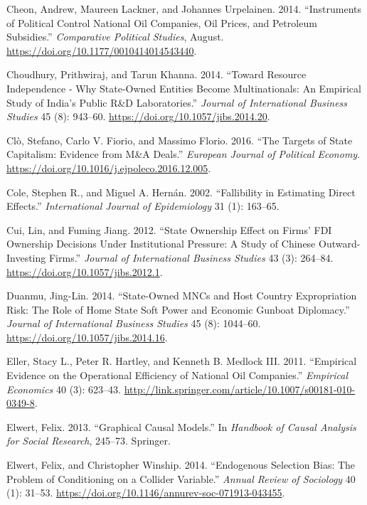 \documentclass[11pt,]{book}
\begin{document}
\leavevmode\hypertarget{ref-cheon_instruments_2014}{}%
Cheon, Andrew, Maureen Lackner, and Johannes Urpelainen. 2014. ``Instruments of Political Control National Oil Companies, Oil Prices, and Petroleum Subsidies.'' \emph{Comparative Political Studies}, August. \url{https://doi.org/10.1177/0010414014543440}.

\leavevmode\hypertarget{ref-choudhury_toward_2014}{}%
Choudhury, Prithwiraj, and Tarun Khanna. 2014. ``Toward Resource Independence - Why State-Owned Entities Become Multinationals: An Empirical Study of India's Public R\&D Laboratories.'' \emph{Journal of International Business Studies} 45 (8): 943--60. \url{https://doi.org/10.1057/jibs.2014.20}.

\leavevmode\hypertarget{ref-clo_targets_2016}{}%
Clò, Stefano, Carlo V. Fiorio, and Massimo Florio. 2016. ``The Targets of State Capitalism: Evidence from M\&A Deals.'' \emph{European Journal of Political Economy}. \url{https://doi.org/10.1016/j.ejpoleco.2016.12.005}.

\leavevmode\hypertarget{ref-cole_fallibility_2002}{}%
Cole, Stephen R., and Miguel A. Hernán. 2002. ``Fallibility in Estimating Direct Effects.'' \emph{International Journal of Epidemiology} 31 (1): 163--65.

\leavevmode\hypertarget{ref-cui_state_2012}{}%
Cui, Lin, and Fuming Jiang. 2012. ``State Ownership Effect on Firms' FDI Ownership Decisions Under Institutional Pressure: A Study of Chinese Outward-Investing Firms.'' \emph{Journal of International Business Studies} 43 (3): 264--84. \url{https://doi.org/10.1057/jibs.2012.1}.

\leavevmode\hypertarget{ref-duanmu_state-owned_2014}{}%
Duanmu, Jing-Lin. 2014. ``State-Owned MNCs and Host Country Expropriation Risk: The Role of Home State Soft Power and Economic Gunboat Diplomacy.'' \emph{Journal of International Business Studies} 45 (8): 1044--60. \url{https://doi.org/10.1057/jibs.2014.16}.

\leavevmode\hypertarget{ref-eller_empirical_2011}{}%
Eller, Stacy L., Peter R. Hartley, and Kenneth B. Medlock III. 2011. ``Empirical Evidence on the Operational Efficiency of National Oil Companies.'' \emph{Empirical Economics} 40 (3): 623--43. \url{http://link.springer.com/article/10.1007/s00181-010-0349-8}.

\leavevmode\hypertarget{ref-elwert_graphical_2013}{}%
Elwert, Felix. 2013. ``Graphical Causal Models.'' In \emph{Handbook of Causal Analysis for Social Research}, 245--73. Springer.

\leavevmode\hypertarget{ref-elwert_endogenous_2014}{}%
Elwert, Felix, and Christopher Winship. 2014. ``Endogenous Selection Bias: The Problem of Conditioning on a Collider Variable.'' \emph{Annual Review of Sociology} 40 (1): 31--53. \url{https://doi.org/10.1146/annurev-soc-071913-043455}.
\end{document}
